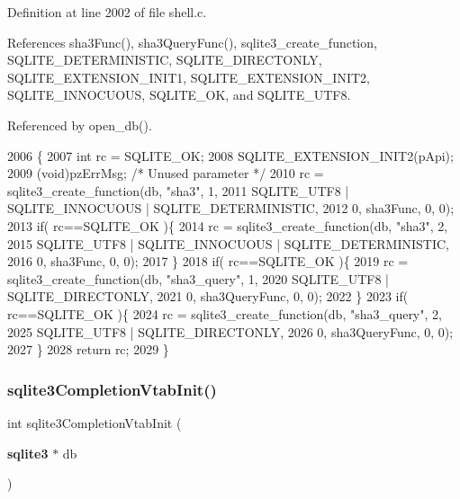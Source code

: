 Definition at line 2002 of file shell.\+c.



References sha3\+Func(), sha3\+Query\+Func(), sqlite3\+\_\+create\+\_\+function, S\+Q\+L\+I\+T\+E\+\_\+\+D\+E\+T\+E\+R\+M\+I\+N\+I\+S\+T\+IC, S\+Q\+L\+I\+T\+E\+\_\+\+D\+I\+R\+E\+C\+T\+O\+N\+LY, S\+Q\+L\+I\+T\+E\+\_\+\+E\+X\+T\+E\+N\+S\+I\+O\+N\+\_\+\+I\+N\+I\+T1, S\+Q\+L\+I\+T\+E\+\_\+\+E\+X\+T\+E\+N\+S\+I\+O\+N\+\_\+\+I\+N\+I\+T2, S\+Q\+L\+I\+T\+E\+\_\+\+I\+N\+N\+O\+C\+U\+O\+US, S\+Q\+L\+I\+T\+E\+\_\+\+OK, and S\+Q\+L\+I\+T\+E\+\_\+\+U\+T\+F8.



Referenced by open\+\_\+db().


\begin{DoxyCode}
2006  \{
2007   \textcolor{keywordtype}{int} rc = SQLITE_OK;
2008   SQLITE_EXTENSION_INIT2(pApi);
2009   (void)pzErrMsg;  \textcolor{comment}{/* Unused parameter */}
2010   rc = sqlite3_create_function(db, \textcolor{stringliteral}{"sha3"}, 1,
2011                       SQLITE_UTF8 | SQLITE_INNOCUOUS | SQLITE_DETERMINISTIC,
2012                       0, sha3Func, 0, 0);
2013   \textcolor{keywordflow}{if}( rc==SQLITE_OK )\{
2014     rc = sqlite3_create_function(db, \textcolor{stringliteral}{"sha3"}, 2,
2015                       SQLITE_UTF8 | SQLITE_INNOCUOUS | SQLITE_DETERMINISTIC,
2016                       0, sha3Func, 0, 0);
2017   \}
2018   \textcolor{keywordflow}{if}( rc==SQLITE_OK )\{
2019     rc = sqlite3_create_function(db, \textcolor{stringliteral}{"sha3\_query"}, 1,
2020                       SQLITE_UTF8 | SQLITE_DIRECTONLY,
2021                       0, sha3QueryFunc, 0, 0);
2022   \}
2023   \textcolor{keywordflow}{if}( rc==SQLITE_OK )\{
2024     rc = sqlite3_create_function(db, \textcolor{stringliteral}{"sha3\_query"}, 2,
2025                       SQLITE_UTF8 | SQLITE_DIRECTONLY,
2026                       0, sha3QueryFunc, 0, 0);
2027   \}
2028   \textcolor{keywordflow}{return} rc;
2029 \}
\end{DoxyCode}
\mbox{\label{shell_8c_a1435582714ae499a0c959340ef96c2a3}} 
\subsubsection{sqlite3\+Completion\+Vtab\+Init()}
{\footnotesize\ttfamily int sqlite3\+Completion\+Vtab\+Init (\begin{DoxyParamCaption}\item[{\textbf{ sqlite3} $\ast$}]{db }\end{DoxyParamCaption})}



